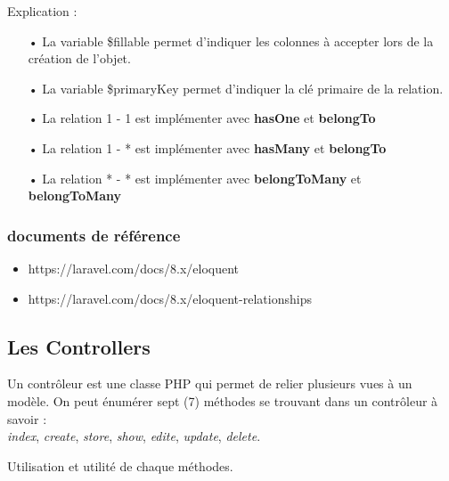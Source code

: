 \documentclass[12pt,a4paper]{article}
\begin{document}
Explication :\\



\begin{itemize}


\item[•] La variable \$fillable permet d'indiquer les colonnes à accepter lors de la création de l'objet.\\

\item[•] La variable \$primaryKey permet d'indiquer la clé primaire de la relation.\\

\item[•] La relation  1 - 1 est implémenter avec \textbf{hasOne} et \textbf{belongTo}\\

\item[•] La relation  1 - * est implémenter avec \textbf{hasMany} et \textbf{belongTo}\\

\item[•] La relation  * - * est implémenter avec \textbf{belongToMany} et \textbf{belongToMany}\\

\end{itemize}


\subsubsection{documents de référence}


\begin{itemize}

\item https://laravel.com/docs/8.x/eloquent\\

\item https://laravel.com/docs/8.x/eloquent-relationships\\

\end{itemize}


\subsection{Les Controllers}

Un contrôleur est une classe PHP qui permet de relier plusieurs vues à un modèle. On peut énumérer sept (7) méthodes se trouvant dans un contrôleur à savoir : \\
\textit{index}, \textit{create}, \textit{store}, \textit{show}, \textit{edite}, \textit{update}, \textit{delete}.\par
Utilisation et utilité de chaque méthodes.\\
\end{document}
